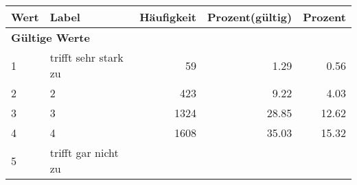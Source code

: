      \begin{longtable}{lXrrr}
     \toprule
     \textbf{Wert} & \textbf{Label} & \textbf{Häufigkeit} & \textbf{Prozent(gültig)} & \textbf{Prozent} \\
     \endhead
     \midrule
     \multicolumn{5}{l}{\textbf{Gültige Werte}}\\

     1 &
     \multicolumn{1}{X}{ trifft sehr stark zu   } &


       \num{59} &
       \num[round-mode=places,round-precision=2]{1.29} &
         \num[round-mode=places,round-precision=2]{0.56} \\

     2 &
     \multicolumn{1}{X}{ 2   } &


       \num{423} &
       \num[round-mode=places,round-precision=2]{9.22} &
         \num[round-mode=places,round-precision=2]{4.03} \\

     3 &
     \multicolumn{1}{X}{ 3   } &


       \num{1324} &
       \num[round-mode=places,round-precision=2]{28.85} &
         \num[round-mode=places,round-precision=2]{12.62} \\

     4 &
     \multicolumn{1}{X}{ 4   } &


       \num{1608} &
       \num[round-mode=places,round-precision=2]{35.03} &
         \num[round-mode=places,round-precision=2]{15.32} \\

     5 &
     \multicolumn{1}{X}{ trifft gar nicht zu   } &



\end{longtable}
